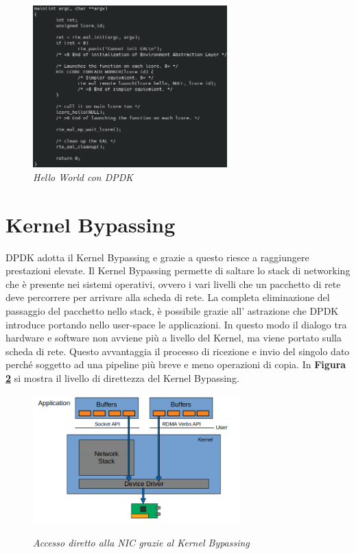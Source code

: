 \FloatBarrier
\begin{figure}[h]
\includegraphics[width=7.5cm]{images/helloworld_dpdk.png}
\centering
\caption{\textit{Hello World con DPDK}}
\label{fig:helloworld_dpdk}
\end{figure}
\FloatBarrier
\section*{Kernel Bypassing}
DPDK adotta il Kernel Bypassing \cite{enberg_kernel-bypass_2018} e grazie a questo riesce a raggiungere prestazioni elevate.
Il Kernel Bypassing permette di saltare lo stack di networking che è presente nei sistemi operativi, ovvero i vari livelli che un pacchetto di rete deve percorrere per arrivare alla scheda di rete. La completa eliminazione del passaggio del pacchetto nello stack, è possibile grazie all' astrazione che DPDK introduce portando nello user-space le applicazioni. In questo modo il dialogo tra hardware e software non avviene più a livello del Kernel, ma viene portato sulla scheda di rete. Questo avvantaggia il processo di ricezione e invio del singolo dato perché soggetto ad una pipeline più breve e meno operazioni di copia. In \textbf{Figura \ref{fig:kernel_bypassing}} si mostra il livello di direttezza del Kernel Bypassing.

\FloatBarrier
\begin{figure}[h]
\includegraphics[width=8cm]{images/kernel_bypassing.png}
\centering
\caption{\textit{Accesso diretto alla NIC grazie al Kernel Bypassing}} \cite{noauthor_kernel-networking-vs-kernel-bypassingppm_nodate}
\label{fig:kernel_bypassing}
\end{figure}
\FloatBarrier

